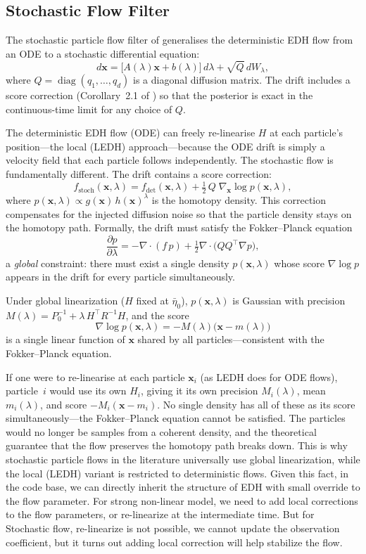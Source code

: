 \documentclass{article}
\renewcommand{\v}[1]{ \ensuremath{ {\mathbf{#1}} }}
\begin{document}
\subsection{Stochastic Flow Filter}

The stochastic particle flow filter of \cite{dai-new-2021} generalises the deterministic EDH flow from an ODE to a stochastic differential equation:
\[
  d\v{x} = \bigl[A(\lambda)\v{x} + b(\lambda)\bigr]\,d\lambda + \sqrt{Q}\,dW_\lambda,
\]
where $Q = \operatorname{diag}(q_1,\ldots,q_d)$ is a diagonal diffusion matrix. The drift includes a score correction (Corollary~2.1 of \cite{dai-new-2021}) so that the posterior is exact in the continuous-time limit for any choice of $Q$.

The deterministic EDH flow (ODE) can freely re-linearise $H$ at each particle's position---the local (LEDH) approach---because the ODE drift is simply a velocity field that each particle follows independently. The stochastic flow is fundamentally different. The drift contains a score correction:
\[
  f_{\mathrm{stoch}}(\v{x},\lambda)
  = f_{\mathrm{det}}(\v{x},\lambda)
    + \tfrac{1}{2}\,Q\;\nabla_{\v{x}} \log p(\v{x},\lambda),
\]
where $p(\v{x},\lambda) \propto g(\v{x})\,h(\v{x})^{\lambda}$ is the homotopy density. This correction compensates for the injected diffusion noise so that the particle density stays on the homotopy path. Formally, the drift must satisfy the Fokker--Planck equation
\[
  \frac{\partial p}{\partial\lambda}
  = -\nabla\!\cdot\!(f\,p) + \tfrac{1}{2}\nabla\!\cdot\!\bigl(QQ^\top \nabla p\bigr),
\]
a \emph{global} constraint: there must exist a single density $p(\v{x},\lambda)$ whose score $\nabla\log p$ appears in the drift for every particle simultaneously.

Under global linearization ($H$ fixed at $\bar\eta_0$), $p(\v{x},\lambda)$ is Gaussian with precision $M(\lambda) = P_0^{-1} + \lambda\,H^\top R^{-1}H$, and the score
\[
  \nabla\log p(\v{x},\lambda) = -M(\lambda)\bigl(\v{x} - m(\lambda)\bigr)
\]
is a single linear function of $\v{x}$ shared by all particles---consistent with the Fokker--Planck equation.

If one were to re-linearise at each particle $\v{x}_i$ (as LEDH does for ODE flows), particle~$i$ would use its own $H_i$, giving it its own precision $M_i(\lambda)$, mean $m_i(\lambda)$, and score $-M_i(\v{x} - m_i)$. No single density has all of these as its score simultaneously---the Fokker--Planck equation cannot be satisfied. The particles would no longer be samples from a coherent density, and the theoretical guarantee that the flow preserves the homotopy path breaks down. This is why stochastic particle flows in the literature universally use global linearization, while the local (LEDH) variant is restricted to deterministic flows. Given this fact, in the code base, we can directly inherit the structure of EDH with small override to the flow parameter. For strong non-linear model, we need to add local corrections to the flow parameters, or re-linearize at the intermediate time. But for Stochastic flow, re-linearize is not possible, we cannot update the observation coefficient, but it turns out adding local correction will help stabilize the flow. 
\end{document}

